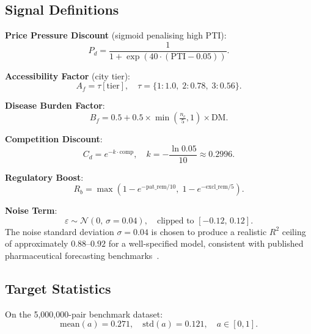 \documentclass[10pt,journal,compsoc]{IEEEtran}
\begin{document}
\subsection{Signal Definitions}

\textbf{Price Pressure Discount} (sigmoid penalising high PTI):
\begin{equation}
  P_d = \frac{1}{1+\exp\!\left(40\cdot(\text{PTI}-0.05)\right)}.
  \label{eq:price_disc}
\end{equation}

\textbf{Accessibility Factor} (city tier):
\begin{equation}
  A_f = \tau[\text{tier}],\quad \tau=\{1{:}1.0,\;2{:}0.78,\;3{:}0.56\}.
  \label{eq:access_fac}
\end{equation}

\textbf{Disease Burden Factor}:
\begin{equation}
  B_f = 0.5 + 0.5\times\min\!\left(\tfrac{n_c}{5},1\right)\times\text{DM}.
  \label{eq:burden_fac}
\end{equation}

\textbf{Competition Discount}:
\begin{equation}
  C_d = e^{-k\cdot\text{comp}},\quad k=-\frac{\ln 0.05}{10}\approx 0.2996.
  \label{eq:comp_disc}
\end{equation}

\textbf{Regulatory Boost}:
\begin{equation}
  R_b = \max\!\left(1-e^{-\text{pat\_rem}/10},\;1-e^{-\text{excl\_rem}/5}\right).
  \label{eq:reg_boost}
\end{equation}

\textbf{Noise Term}:
\begin{equation}
  \varepsilon\sim\mathcal{N}(0,\,\sigma{=}0.04),\quad
  \text{clipped to }[-0.12,\,0.12].
  \label{eq:noise}
\end{equation}
The noise standard deviation $\sigma=0.04$ is chosen to produce a realistic $R^2$
ceiling of approximately $0.88$--$0.92$ for a well-specified model, consistent with
published pharmaceutical forecasting benchmarks~\cite{jiang2020}.

\subsection{Target Statistics}

On the 5{,}000{,}000-pair benchmark dataset:
\[
  \text{mean}(a)=0.271,\quad \text{std}(a)=0.121,\quad a\in[0,1].
\]

\end{document}

